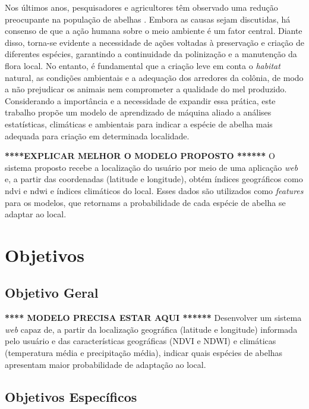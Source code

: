 Nos últimos anos, pesquisadores e agricultores têm observado uma redução preocupante na população de abelhas \cite{BERINGER_MACIEL_TRAMONTINA_2019}. Embora as causas sejam discutidas, há consenso de que a ação humana sobre o meio ambiente é um fator central. Diante disso, torna-se evidente a necessidade de ações voltadas à preservação e criação de diferentes espécies, garantindo a continuidade da polinização e a manutenção da flora local. No entanto, é fundamental que a criação leve em conta o \textit{habitat} natural, as condições ambientais e a adequação dos arredores da colônia, de modo a não prejudicar os animais nem comprometer a qualidade do mel produzido. Considerando a importância e a necessidade de expandir essa prática, este trabalho propõe um modelo de aprendizado de máquina aliado a análises estatísticas, climáticas e ambientais para indicar a espécie de abelha mais adequada para criação em determinada localidade.


\textbf{****EXPLICAR MELHOR O MODELO PROPOSTO  ******}
O sistema proposto recebe a localização do usuário por meio de uma aplicação \textit{web} e, a partir das coordenadas (latitude e longitude), obtém índices geográficos como \gls{ndvi} e \gls{ndwi} e índices climáticos do local. Esses dados são utilizados como \textit{features} para os modelos, que retornams a probabilidade de cada espécie de abelha se adaptar ao local.


\section{Objetivos}

\subsection{Objetivo Geral}

\textbf{**** MODELO PRECISA ESTAR AQUI ******}
Desenvolver um sistema \textit{web} capaz de, a partir da localização geográfica (latitude e longitude) informada pelo usuário e das características geográficas (NDVI e NDWI) e climáticas (temperatura média e precipitação média), indicar quais espécies de abelhas apresentam maior probabilidade de adaptação ao local.

\subsection{Objetivos Específicos}


